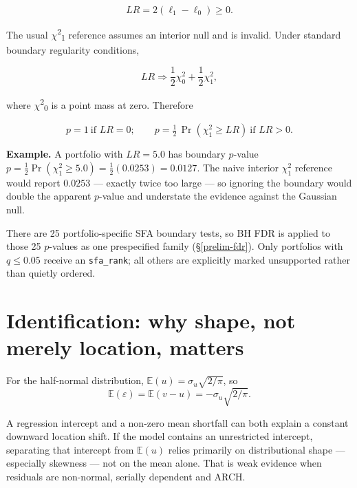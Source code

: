 \begin{equation}
LR = 2(\ell _{1}-\ell _{0}) \geq  0.
\end{equation}

The usual \ensuremath{\chi }\textsuperscript{2}\textsubscript{1} reference assumes an interior null and is
invalid. Under standard boundary regularity conditions,

\begin{equation}
LR \Rightarrow  \frac{1}{2}\chi ^{2}_{0} + \frac{1}{2}\chi ^{2}_{1},
\end{equation}

where \ensuremath{\chi }\textsuperscript{2}\textsubscript{0} is a point mass at zero. Therefore

\begin{equation}\label{eq:ch14-boundaryp}
p=1 \ \text{if } LR=0; \qquad p=\tfrac{1}{2}\,\Pr(\chi ^{2}_{1}\geq LR) \ \text{if } LR>0.
\end{equation}

\textbf{Example.} A portfolio with $LR=5.0$ has boundary $p$-value
$p=\tfrac12\Pr(\chi^2_1\ge5.0)=\tfrac12(0.0253)=0.0127$. The naive interior
$\chi^2_1$ reference would report $0.0253$ --- exactly twice too large --- so
ignoring the boundary would double the apparent $p$-value and understate the
evidence against the Gaussian null.

There are 25 portfolio-specific SFA boundary tests, so BH FDR is applied to
those 25 $p$-values as one prespecified family (\S\ref{prelim-fdr}). Only
portfolios with $q\le0.05$ receive an \texttt{sfa\_rank}; all others are
explicitly marked unsupported rather than quietly ordered.

\hypertarget{identification-why-shape-not-merely-location-matters}{%
\section{Identification: why shape, not merely location,
matters}\label{identification-why-shape-not-merely-location-matters}}

For the half-normal distribution, $\mathbb{E}(u)=\sigma_u\sqrt{2/\pi}$, so
\begin{equation}\label{eq:ch14-meanshift}
\mathbb{E}(\varepsilon )=\mathbb{E}(v-u)=-\sigma _{u}\sqrt{2/\pi }.
\end{equation}

A regression intercept and a non-zero mean shortfall can both explain a
constant downward location shift. If the model contains an unrestricted
intercept, separating that intercept from $\mathbb{E}(u)$ relies primarily
on distributional shape --- especially skewness --- not on the mean alone.
That is weak evidence when residuals are non-normal, serially dependent and
ARCH.

